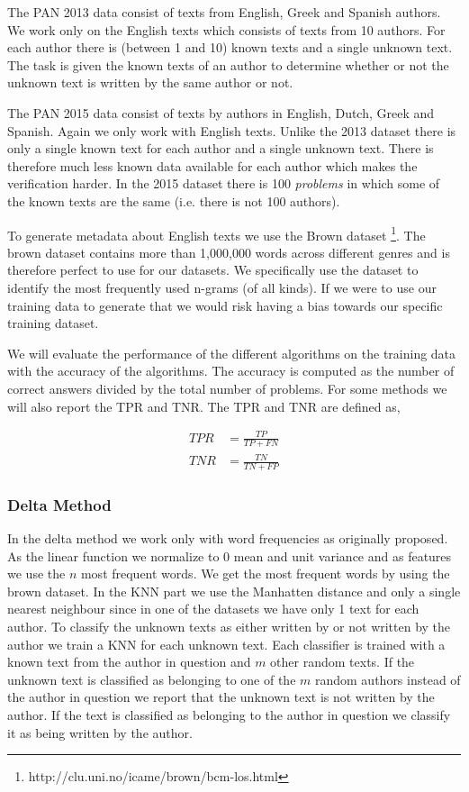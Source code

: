 The PAN 2013 data consist of texts from English, Greek and Spanish authors. We
work only on the English texts which consists of texts from 10 authors. For
each author there is (between 1 and 10) known texts and a single unknown text.
The task is given the known texts of an author to determine whether or not the
unknown text is written by the same author or not.

The PAN 2015 data consist of texts by authors in English, Dutch, Greek and
Spanish. Again we only work with English texts. Unlike the 2013 dataset there is
only a single known text for each author and a single unknown text. There is
therefore much less known data available for each author which makes the
verification harder. In the 2015 dataset there is 100 \textit{problems} in which
some of the known texts are the same (i.e. there is not 100 authors).

To generate metadata about English texts we use the Brown dataset
\footnote{http://clu.uni.no/icame/brown/bcm-los.html}. The brown dataset
contains more than 1,000,000 words across different genres and is therefore
perfect to use for our datasets. We specifically use the dataset to identify
the most frequently used n-grams (of all kinds). If we were to use our training
data to generate that we would risk having a bias towards our specific training
dataset.

We will evaluate the performance of the different algorithms on the training
data with the accuracy of the algorithms. The accuracy is computed as the number
of correct answers divided by the total number of problems. For some methods we
will also report the \gls{TPR} and \gls{TNR}. The \gls{TPR} and \gls{TNR} are
defined as,

\begin{align}
    TPR &= \frac{TP}{TP + FN} \\
    TNR &= \frac{TN}{TN + FP}
\end{align}

\subsubsection{Delta Method}
In the delta method we work only with word frequencies as originally proposed.
As the linear function we normalize to 0 mean and unit variance and as features
we use the $n$ most frequent words. We get the most frequent words by using the
brown dataset. In the \gls{KNN} part we use the Manhatten distance and only a
single nearest neighbour since in one of the datasets we have only 1 text for
each author. To classify the unknown texts as either written by or not written
by the author we train a \gls{KNN} for each unknown text. Each classifier is
trained with a known text from the author in question and $m$ other random
texts. If the unknown text is classified as belonging to one of the $m$ random
authors instead of the author in question we report that the unknown text is not
written by the author. If the text is classified as belonging to the author in
question we classify it as being written by the author.

